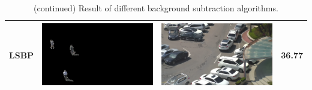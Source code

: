 \documentclass[11pt]{hyu_thesis}
\begin{document}
\begin{table}
\begin{tabular}{cccc}
		LSBP & \parbox[c]{0.35\linewidth}{\includegraphics[width=\linewidth]{bgm-fg-LSBP.png}} & \parbox[c]{0.35\linewidth}{\includegraphics[width=\linewidth]{bgm-bg-LSBP.png}} & 36.77 \\
		\hline
	\end{tabular}
	\caption{(continued) Result of different background subtraction algorithms.}
\end{table}
\end{document}
